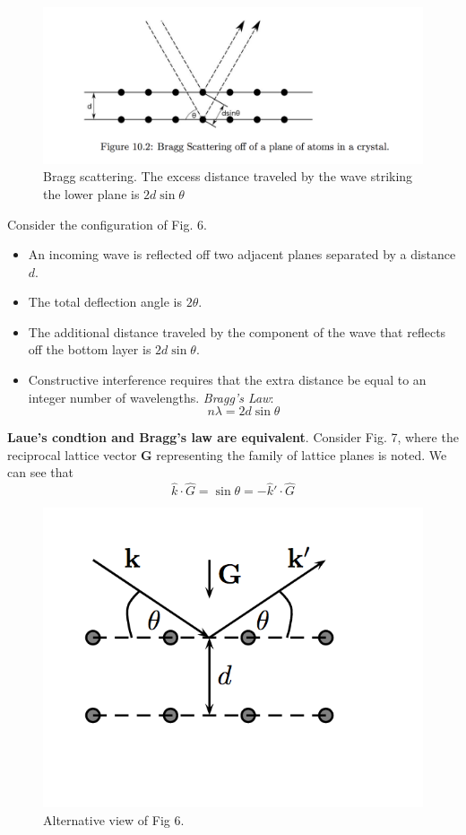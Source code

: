 \documentclass[10pt]{article}
\begin{document}
\begin{figure}
  \includegraphics[width=\linewidth]{scattering2.png}
  \caption{Bragg scattering. The excess distance traveled by the wave striking the lower plane is $2d\sin\theta$}
\end{figure}

Consider the configuration of Fig. 6.
\begin{itemize}
  \item An incoming wave is reflected off two adjacent planes separated by a distance $d$.
  \item The total deflection angle is $2\theta$.
  \item The additional distance traveled by the component of the wave that reflects off the bottom layer is $2d\sin\theta$.
  \item Constructive interference requires that the extra distance be equal to an integer number of wavelengths. \emph{Bragg's Law}:
  $$n\lambda = 2d\sin\theta$$
\end{itemize}

\textbf{Laue's condtion and Bragg's law are equivalent}.
Consider Fig. 7, where the reciprocal lattice vector $\textbf{G}$ representing the family of lattice planes is noted. We can see that
$$\hat{k}\cdot\hat{G} = \sin\theta = -\hat{k}'\cdot\hat{G}$$
\begin{figure}
  \includegraphics[width=\linewidth]{scattering3.png}
  \caption{Alternative view of Fig 6. }
\end{figure}
\end{document}
